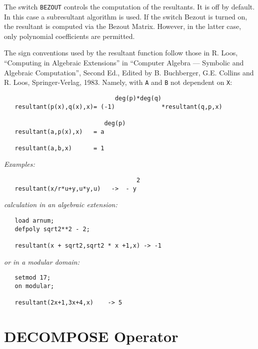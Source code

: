 The switch {\tt BEZOUT} controls the computation of the
resultants. It is off by default. In this case a subresultant algorithm
is used. If the switch Bezout is turned on, the resultant is computed via
the Bezout Matrix. However, in the latter case, only polynomial coefficients
are permitted.

\begin{samepage}
The sign conventions used by the resultant function follow those in R.
Loos, ``Computing in Algebraic Extensions'' in ``Computer Algebra --- Symbolic
and Algebraic Computation'', Second Ed., Edited by B. Buchberger, G.E.
Collins and R. Loos, Springer-Verlag, 1983. Namely, with {\tt A} and {\tt B}
not dependent on {\tt X}:

\begin{verbatim}
                               deg(p)*deg(q)
   resultant(p(x),q(x),x)= (-1)             *resultant(q,p,x)

                            deg(p)
   resultant(a,p(x),x)   = a

   resultant(a,b,x)      = 1
\end{verbatim}
\end{samepage}

{\it Examples:}

\begin{samepage}
\begin{verbatim}
                                     2
   resultant(x/r*u+y,u*y,u)   ->  - y
\end{verbatim}
\end{samepage}

{\it calculation in an algebraic extension:}

\begin{samepage}
\begin{verbatim}
   load arnum;
   defpoly sqrt2**2 - 2;

   resultant(x + sqrt2,sqrt2 * x +1,x) -> -1
\end{verbatim}
\end{samepage}

{\it or in a modular domain:}

\begin{samepage}
\begin{verbatim}
   setmod 17;
   on modular;

   resultant(2x+1,3x+4,x)    -> 5
\end{verbatim}
\end{samepage}
\section{DECOMPOSE Operator}
\hypertarget{operator:DECOMPOSE}{}

